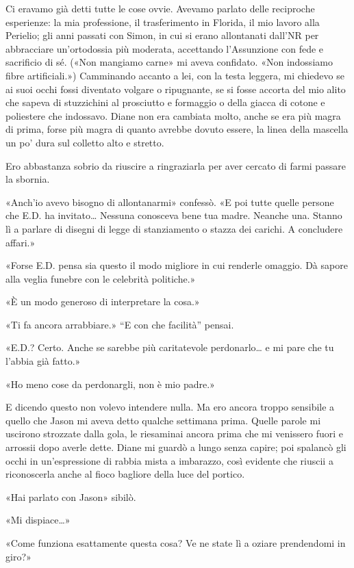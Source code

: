Ci eravamo già detti tutte le cose ovvie. Avevamo parlato delle
reciproche esperienze: la mia professione, il trasferimento in Florida,
il mio lavoro alla Perielio; gli anni passati con Simon, in cui si erano
allontanati dall'NR per abbracciare un'ortodossia più moderata,
accettando l'Assunzione con fede e sacrificio di sé. («Non mangiamo
carne» mi aveva confidato. «Non indossiamo fibre artificiali.»)
Camminando accanto a lei, con la testa leggera, mi chiedevo se ai suoi
occhi fossi diventato volgare o ripugnante, se si fosse accorta del mio
alito che sapeva di stuzzichini al prosciutto e formaggio o della giacca
di cotone e poliestere che indossavo. Diane non era cambiata molto,
anche se era più magra di prima, forse più magra di quanto avrebbe
dovuto essere, la linea della mascella un po' dura sul colletto alto e
stretto.

Ero abbastanza sobrio da riuscire a ringraziarla per aver cercato di
farmi passare la sbornia.

«Anch'io avevo bisogno di allontanarmi» confessò. «E poi tutte quelle
persone che E.D. ha invitato\ldots{} Nessuna conosceva bene tua madre.
Neanche una. Stanno lì a parlare di disegni di legge di stanziamento o
stazza dei carichi. A concludere affari.»

«Forse E.D. pensa sia questo il modo migliore in cui renderle omaggio.
Dà sapore alla veglia funebre con le celebrità politiche.»

«È un modo generoso di interpretare la cosa.»

«Ti fa ancora arrabbiare.» ``E con che facilità'' pensai.

«E.D.? Certo. Anche se sarebbe più caritatevole perdonarlo\ldots{} e mi
pare che tu l'abbia già fatto.»

«Ho meno cose da perdonargli, non è mio padre.»

E dicendo questo non volevo intendere nulla. Ma ero ancora troppo
sensibile a quello che Jason mi aveva detto qualche settimana prima.
Quelle parole mi uscirono strozzate dalla gola, le riesaminai ancora
prima che mi venissero fuori e arrossii dopo averle dette. Diane mi
guardò a lungo senza capire; poi spalancò gli occhi in un'espressione di
rabbia mista a imbarazzo, così evidente che riuscii a riconoscerla anche
al fioco bagliore della luce del portico.

«Hai parlato con Jason» sibilò.

«Mi dispiace\ldots»

«Come funziona esattamente questa cosa? Ve ne state lì a oziare
prendendomi in giro?»

